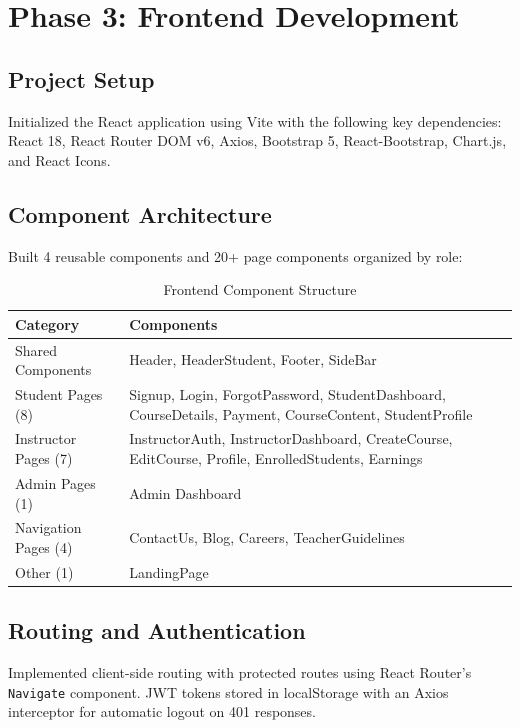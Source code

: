 \documentclass[12pt,a4paper]{report}
\begin{document}
\section{Phase 3: Frontend Development}
\subsection{Project Setup}
Initialized the React application using Vite with the following key dependencies: React 18, React Router DOM v6, Axios, Bootstrap 5, React-Bootstrap, Chart.js, and React Icons.

\subsection{Component Architecture}
Built 4 reusable components and 20+ page components organized by role:

\begin{table}[H]
\centering
\caption{Frontend Component Structure}
\begin{tabular}{@{}lp{8cm}@{}}
\toprule
\textbf{Category} & \textbf{Components} \\ \midrule
Shared Components & Header, HeaderStudent, Footer, SideBar \\
Student Pages (8) & Signup, Login, ForgotPassword, StudentDashboard, CourseDetails, Payment, CourseContent, StudentProfile \\
Instructor Pages (7) & InstructorAuth, InstructorDashboard, CreateCourse, EditCourse, Profile, EnrolledStudents, Earnings \\
Admin Pages (1) & Admin Dashboard \\
Navigation Pages (4) & ContactUs, Blog, Careers, TeacherGuidelines \\
Other (1) & LandingPage \\ \bottomrule
\end{tabular}
\end{table}

\subsection{Routing and Authentication}
Implemented client-side routing with protected routes using React Router's \texttt{Navigate} component. JWT tokens stored in localStorage with an Axios interceptor for automatic logout on 401 responses.
\end{document}
